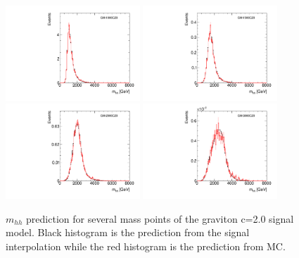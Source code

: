 \begin{figure}[!h]
\begin{center}
\includegraphics*[width=0.45\textwidth]{./figures/boosted/SigInterpolation/InterpolateShape_GC20_1000}
\includegraphics*[width=0.45\textwidth]{./figures/boosted/SigInterpolation/InterpolateShape_GC20_1500}\\
\includegraphics*[width=0.45\textwidth]{./figures/boosted/SigInterpolation/InterpolateShape_GC20_2000}
\includegraphics*[width=0.45\textwidth]{./figures/boosted/SigInterpolation/InterpolateShape_GC20_3000}
\caption{$m_{hh}$ prediction for several mass points of the graviton c=2.0 signal model. Black histogram
is the prediction from the signal interpolation while the red histogram is the prediction from MC.}
\label{fig:boosted_siginter_templates_c20}
\end{center}
\end{figure}
\FloatBarrier


